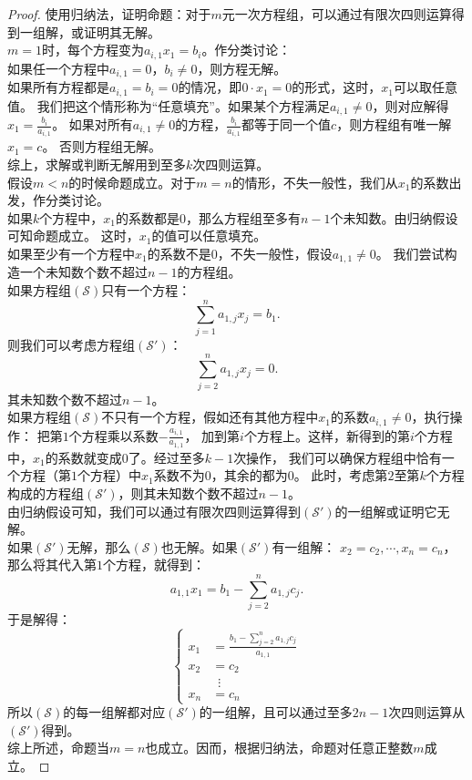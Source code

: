 \documentclass[12pt,UTF8]{ctexbook}
\begin{document}
\begin{proof} %
使用归纳法，证明命题：对于$m$元一次方程组，可以通过有限次四则运算得到一组解，或证明其无解。\\
$m=1$时，每个方程变为$a_{i,1} x_1 = b_{i}$。作分类讨论：\\
如果任一个方程中$a_{i,1} = 0$，$b_{i} \neq 0$，则方程无解。\\
如果所有方程都是$a_{i,1} = b_{i} = 0$的情况，即$0\cdot x_1 = 0$的形式，这时，$x_1$可以取任意值。
我们把这个情形称为“任意填充”。如果某个方程满足$a_{i,1} \neq 0$，则对应解得$x_1 = \frac{b_{i}}{a_{i,1}} $。
如果对所有$a_{i,1} \neq 0$的方程，$\frac{b_{i}}{a_{i,1}}$都等于同一个值$c$，则方程组有唯一解$x_1 = c $。
否则方程组无解。\\
综上，求解或判断无解用到至多$k$次四则运算。\\
假设$m < n$的时候命题成立。对于$m = n$的情形，不失一般性，我们从$x_1$的系数出发，作分类讨论。\\
如果$k$个方程中，$x_1$的系数都是$0$，那么方程组至多有$n-1$个未知数。由归纳假设可知命题成立。
这时，$x_1$的值可以任意填充。\\
如果至少有一个方程中$x_1$的系数不是$0$，不失一般性，假设$a_{1,1} \neq 0$。
我们尝试构造一个未知数个数不超过$n-1$的方程组。\\
如果方程组$(\mathcal{S})$只有一个方程：
$$ \sum_{j=1}^n a_{1,j} x_j = b_{1}. $$
则我们可以考虑方程组$(\mathcal{S}')$：
$$ \sum_{j=2}^n a_{1,j} x_j = 0. $$
其未知数个数不超过$n-1$。\\
如果方程组$(\mathcal{S})$不只有一个方程，假如还有其他方程中$x_1$的系数$a_{i,1} \neq 0$，执行操作：
把第$1$个方程乘以系数$-\frac{a_{i,1}}{a_{1,1}}$，
加到第$i$个方程上。这样，新得到的第$i$个方程中，$x_1$的系数就变成$0$了。经过至多$k-1$次操作，
我们可以确保方程组中恰有一个方程（第$1$个方程）中$x_1$系数不为$0$，其余的都为$0$。
此时，考虑第$2$至第$k$个方程构成的方程组$(\mathcal{S}')$，则其未知数个数不超过$n-1$。\\
由归纳假设可知，我们可以通过有限次四则运算得到$(\mathcal{S}')$的一组解或证明它无解。\\
如果$(\mathcal{S}')$无解，那么$(\mathcal{S})$也无解。如果$(\mathcal{S}')$有一组解：
$x_2 = c_2, \cdots , x_n = c_n$，那么将其代入第$1$个方程，就得到：
$$ a_{1,1} x_1 = b_{1} - \sum_{j=2}^n a_{1,j} c_j. $$
于是解得：
$$ \left\{
    \begin{array}{rl}
    x_1 &= \frac{b_{1} - \sum_{j=2}^n a_{1,j} c_j}{a_{1,1}} \\
    x_2 &= c_2  \\
     \quad & \,\,\,\vdots   \\
    x_n &= c_n 
    \end{array}
\right.$$
所以$(\mathcal{S})$的每一组解都对应$(\mathcal{S}')$的一组解，且可以通过至多$2n-1$次四则运算从$(\mathcal{S}')$得到。\\
综上所述，命题当$m = n$也成立。因而，根据归纳法，命题对任意正整数$m$成立。

\end{proof}
\end{document}
